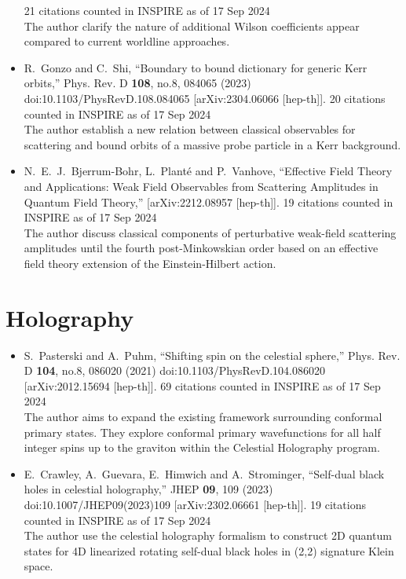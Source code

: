 \documentclass[a4paper,12pt]{article}
\begin{document}
\begin{itemize}
    21 citations counted in INSPIRE as of 17 Sep 2024\\
    The author clarify the nature of additional Wilson coefficients appear compared to current worldline approaches.
    \item %
    R.~Gonzo and C.~Shi,
    ``Boundary to bound dictionary for generic Kerr orbits,''
    Phys. Rev. D \textbf{108}, no.8, 084065 (2023)
    doi:10.1103/PhysRevD.108.084065
    [arXiv:2304.06066 [hep-th]].
    20 citations counted in INSPIRE as of 17 Sep 2024\\
    The author establish a new relation between classical observables for scattering and bound orbits of a massive probe particle in a Kerr background.
    \item %
    N.~E.~J.~Bjerrum-Bohr, L.~Plant\'e and P.~Vanhove,
    ``Effective Field Theory and Applications: Weak Field Observables from Scattering Amplitudes in Quantum Field Theory,''
    [arXiv:2212.08957 [hep-th]].
    19 citations counted in INSPIRE as of 17 Sep 2024\\ 
    The author discuss classical components
    of perturbative weak-field scattering amplitudes until the fourth post-Minkowskian order based on an effective field theory extension of the Einstein-Hilbert action.

\end{itemize}
\section*{Holography}
\begin{itemize}
    \item %
    S.~Pasterski and A.~Puhm,
    ``Shifting spin on the celestial sphere,''
    Phys. Rev. D \textbf{104}, no.8, 086020 (2021)
    doi:10.1103/PhysRevD.104.086020
    [arXiv:2012.15694 [hep-th]].
    69 citations counted in INSPIRE as of 17 Sep 2024\\
    The author aims to  expand the existing framework surrounding conformal primary
    states. They explore conformal primary wavefunctions for all half integer spins up to the graviton within the Celestial Holography program.
    \item %
    E.~Crawley, A.~Guevara, E.~Himwich and A.~Strominger,
    ``Self-dual black holes in celestial holography,''
    JHEP \textbf{09}, 109 (2023)
    doi:10.1007/JHEP09(2023)109
    [arXiv:2302.06661 [hep-th]].
    19 citations counted in INSPIRE as of 17 Sep 2024\\
    The author use the celestial holography formalism to construct 2D quantum states for 4D linearized rotating self-dual black holes in (2,2) signature Klein space.
\end{itemize}
\end{document}
